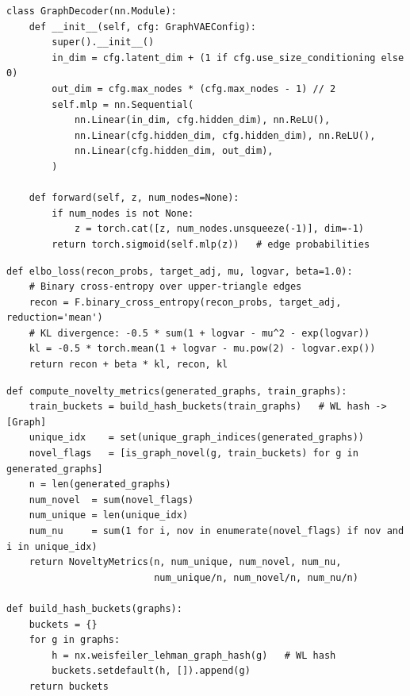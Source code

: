 \documentclass[10pt,a4paper]{article}
\begin{document}
\begin{lstlisting}[caption={MLP decoder: latent code to upper-triangular adjacency logits (model\_gvae.py).}]
class GraphDecoder(nn.Module):
    def __init__(self, cfg: GraphVAEConfig):
        super().__init__()
        in_dim = cfg.latent_dim + (1 if cfg.use_size_conditioning else 0)
        out_dim = cfg.max_nodes * (cfg.max_nodes - 1) // 2
        self.mlp = nn.Sequential(
            nn.Linear(in_dim, cfg.hidden_dim), nn.ReLU(),
            nn.Linear(cfg.hidden_dim, cfg.hidden_dim), nn.ReLU(),
            nn.Linear(cfg.hidden_dim, out_dim),
        )

    def forward(self, z, num_nodes=None):
        if num_nodes is not None:
            z = torch.cat([z, num_nodes.unsqueeze(-1)], dim=-1)
        return torch.sigmoid(self.mlp(z))   # edge probabilities
\end{lstlisting}

\begin{lstlisting}[caption={ELBO loss with beta-weighted KL (train\_gvae.py).}]
def elbo_loss(recon_probs, target_adj, mu, logvar, beta=1.0):
    # Binary cross-entropy over upper-triangle edges
    recon = F.binary_cross_entropy(recon_probs, target_adj, reduction='mean')
    # KL divergence: -0.5 * sum(1 + logvar - mu^2 - exp(logvar))
    kl = -0.5 * torch.mean(1 + logvar - mu.pow(2) - logvar.exp())
    return recon + beta * kl, recon, kl
\end{lstlisting}

\begin{lstlisting}[caption={WL-hash-accelerated novelty and uniqueness computation (metrics.py).}]
def compute_novelty_metrics(generated_graphs, train_graphs):
    train_buckets = build_hash_buckets(train_graphs)   # WL hash -> [Graph]
    unique_idx    = set(unique_graph_indices(generated_graphs))
    novel_flags   = [is_graph_novel(g, train_buckets) for g in generated_graphs]
    n = len(generated_graphs)
    num_novel  = sum(novel_flags)
    num_unique = len(unique_idx)
    num_nu     = sum(1 for i, nov in enumerate(novel_flags) if nov and i in unique_idx)
    return NoveltyMetrics(n, num_unique, num_novel, num_nu,
                          num_unique/n, num_novel/n, num_nu/n)

def build_hash_buckets(graphs):
    buckets = {}
    for g in graphs:
        h = nx.weisfeiler_lehman_graph_hash(g)   # WL hash
        buckets.setdefault(h, []).append(g)
    return buckets
\end{lstlisting}
\end{document}
